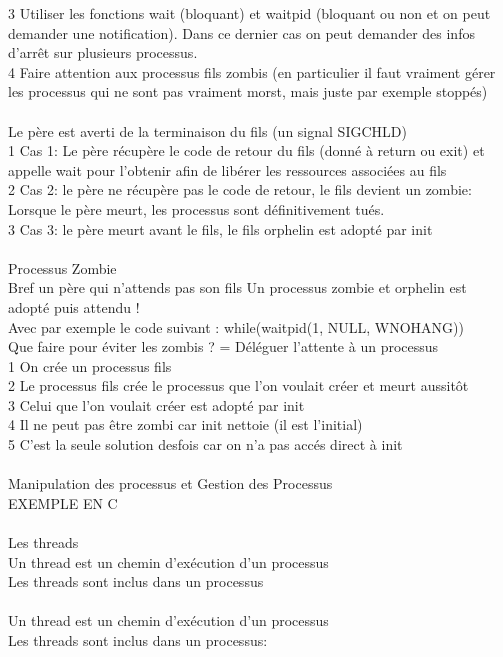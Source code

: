 \documentclass[5pt]{article}
\begin{document}
\begin{scriptsize}
3 Utiliser les fonctions wait (bloquant) et waitpid (bloquant ou non et on peut demander une notification). Dans ce dernier cas on peut demander des infos d’arrêt sur plusieurs processus.\\
4 Faire attention aux processus fils zombis (en particulier il faut vraiment gérer les processus qui ne sont pas vraiment morst, mais juste par exemple stoppés)\\
\\
Le père est averti de la terminaison du fils (un signal SIGCHLD)\\
1 Cas 1: Le père récupère le code de retour du fils (donné à return ou exit) et appelle wait pour l’obtenir afin de libérer les ressources associées au fils\\
2 Cas 2: le père ne récupère pas le code de retour, le fils devient un zombie: Lorsque le père meurt, les processus sont définitivement tués. \\
3 Cas 3: le père meurt avant le fils, le fils orphelin est adopté par init\\
\\
Processus Zombie\\
Bref un père qui n’attends pas son fils Un processus zombie et orphelin est adopté puis attendu !\\
Avec par exemple le code suivant : while(waitpid(1, NULL, WNOHANG))\\
Que faire pour éviter les zombis ? = Déléguer l’attente à un processus\\
1 On crée un processus fils\\
2 Le processus fils crée le processus que l’on voulait créer et meurt aussitôt\\
3 Celui que l’on voulait créer est adopté par init\\
4 Il ne peut pas être zombi car init nettoie (il est l’initial)\\
5 C’est la seule solution desfois car on n’a pas accés direct à init\\
\\
Manipulation des processus et Gestion des Processus\\ 
EXEMPLE EN C\\
\\
Les threads\\
Un thread est un chemin d’exécution d’un processus\\
Les threads sont inclus dans un processus\\
\\
Un thread est un chemin d’exécution d’un processus\\Les threads sont inclus dans un processus:\\

\end{scriptsize}
\end{document}
